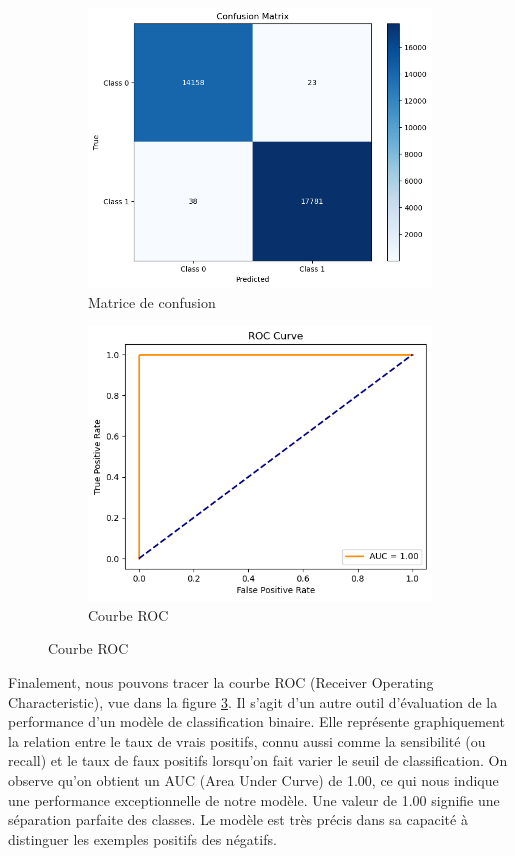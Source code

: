 \documentclass[11pt, parskip=half]{scrartcl} %
\begin{document}
\begin{figure}[h]
	\begin{subfigure}[c]{0.5\textwidth}
		\centering
		\includegraphics[width=0.9\linewidth]{./figures/matrix_CNN.png}
		\caption{Matrice de confusion}
		\label{fig:matrix_CNN}
	\end{subfigure}
	\begin{subfigure}[c]{0.5\textwidth}
		\centering
		\includegraphics[width=0.9\linewidth]{./figures/ROC.png}
		\caption{Courbe ROC}
		\label{fig:ROC}
	\end{subfigure}

\end{figure}

Finalement, nous pouvons tracer la courbe ROC (Receiver Operating Characteristic), vue dans la figure \ref{fig:ROC}. Il s’agit d’un autre outil d’évaluation de la performance d’un modèle de classification binaire. Elle représente graphiquement la relation entre le taux de vrais positifs, connu aussi comme la sensibilité (ou recall) et le taux de faux positifs lorsqu’on fait varier le seuil de classification. On observe qu’on obtient un AUC (Area Under Curve) de 1.00, ce qui nous indique une performance exceptionnelle de notre modèle. Une valeur de 1.00 signifie une séparation parfaite des classes. Le modèle est très précis dans sa capacité à distinguer les exemples positifs des négatifs.
\end{document}
